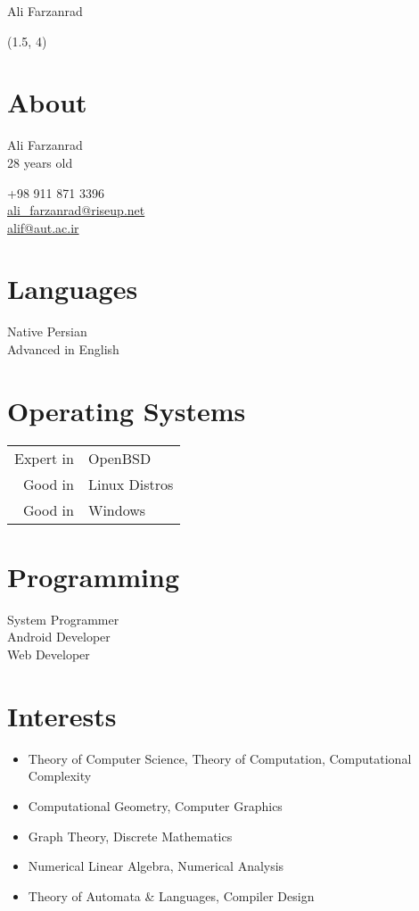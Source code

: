 \documentclass[a4paper,10pt]{article}
\begin{document}
{\Huge Ali Farzanrad}

\begin{textblock}{3.8}(1.5, 4)
	\raggedleft
	\section*{About}

	Ali Farzanrad \\
	28 years old

	+98 911 871 3396 \\
	\href{mailto:ali_farzanrad@riseup.net}{ali\_farzanrad@riseup.net} \\
	\href{mailto:alif@aut.ac.ir}{alif@aut.ac.ir}

	\section*{Languages}

	Native Persian \\
	Advanced in English

	\section*{Operating Systems}

	\begin{tabular}{rl}
		Expert in & OpenBSD \\
		Good in & Linux Distros \\
		Good in & Windows
	\end{tabular}

	\section*{Programming}

	System Programmer \\
	Android Developer \\
	Web Developer

\end{textblock}

\section*{{\color{blue}Interests}}
\begin{itemize}
	\item Theory of Computer Science, Theory of Computation,
	    Computational Complexity
	\item Computational Geometry, Computer Graphics
	\item Graph Theory, Discrete Mathematics
	\item Numerical Linear Algebra, Numerical Analysis
	\item Theory of Automata \& Languages, Compiler Design
\end{itemize}
\end{document}
